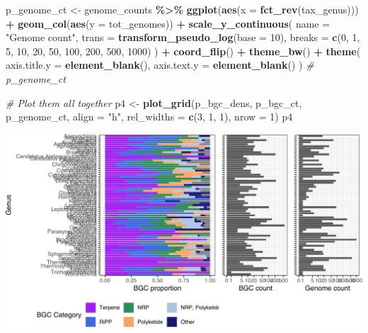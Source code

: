 \documentclass[
]{article}
\newenvironment{Shaded}{\begin{snugshade}}{\end{snugshade}}
\newcommand{\AttributeTok}[1]{\textcolor[rgb]{0.13,0.29,0.53}{#1}}
\newcommand{\CommentTok}[1]{\textcolor[rgb]{0.56,0.35,0.01}{\textit{#1}}}
\newcommand{\DecValTok}[1]{\textcolor[rgb]{0.00,0.00,0.81}{#1}}
\newcommand{\FunctionTok}[1]{\textcolor[rgb]{0.13,0.29,0.53}{\textbf{#1}}}
\newcommand{\NormalTok}[1]{#1}
\newcommand{\OtherTok}[1]{\textcolor[rgb]{0.56,0.35,0.01}{#1}}
\newcommand{\SpecialCharTok}[1]{\textcolor[rgb]{0.81,0.36,0.00}{\textbf{#1}}}
\newcommand{\StringTok}[1]{\textcolor[rgb]{0.31,0.60,0.02}{#1}}
\begin{document}
\begin{Shaded}
\begin{Highlighting}[]
\NormalTok{p\_genome\_ct }\OtherTok{\textless{}{-}}\NormalTok{ genome\_counts }\SpecialCharTok{\%\textgreater{}\%}
  \FunctionTok{ggplot}\NormalTok{(}\FunctionTok{aes}\NormalTok{(}\AttributeTok{x =} \FunctionTok{fct\_rev}\NormalTok{(tax\_genus))) }\SpecialCharTok{+}
  \FunctionTok{geom\_col}\NormalTok{(}\FunctionTok{aes}\NormalTok{(}\AttributeTok{y =}\NormalTok{ tot\_genomes)) }\SpecialCharTok{+}
  \FunctionTok{scale\_y\_continuous}\NormalTok{(}
    \AttributeTok{name =} \StringTok{"Genome count"}\NormalTok{,}
    \AttributeTok{trans =} \FunctionTok{transform\_pseudo\_log}\NormalTok{(}\AttributeTok{base =} \DecValTok{10}\NormalTok{),}
    \AttributeTok{breaks =} \FunctionTok{c}\NormalTok{(}\DecValTok{0}\NormalTok{, }\DecValTok{1}\NormalTok{, }\DecValTok{5}\NormalTok{, }\DecValTok{10}\NormalTok{, }\DecValTok{20}\NormalTok{, }\DecValTok{50}\NormalTok{, }\DecValTok{100}\NormalTok{, }\DecValTok{200}\NormalTok{, }\DecValTok{500}\NormalTok{, }\DecValTok{1000}\NormalTok{)}
\NormalTok{  ) }\SpecialCharTok{+}
  \FunctionTok{coord\_flip}\NormalTok{() }\SpecialCharTok{+}
  \FunctionTok{theme\_bw}\NormalTok{() }\SpecialCharTok{+}
  \FunctionTok{theme}\NormalTok{(}
    \AttributeTok{axis.title.y =} \FunctionTok{element\_blank}\NormalTok{(),}
    \AttributeTok{axis.text.y =} \FunctionTok{element\_blank}\NormalTok{()}
\NormalTok{  )}
\CommentTok{\# p\_genome\_ct}

\CommentTok{\# Plot them all together}
\NormalTok{p4 }\OtherTok{\textless{}{-}} \FunctionTok{plot\_grid}\NormalTok{(p\_bgc\_dens, p\_bgc\_ct, p\_genome\_ct, }\AttributeTok{align =} \StringTok{"h"}\NormalTok{, }\AttributeTok{rel\_widths =} \FunctionTok{c}\NormalTok{(}\DecValTok{3}\NormalTok{, }\DecValTok{1}\NormalTok{, }\DecValTok{1}\NormalTok{), }\AttributeTok{nrow =} \DecValTok{1}\NormalTok{)}
\NormalTok{p4}
\end{Highlighting}
\end{Shaded}

\includegraphics{analysis_files/figure-latex/unnamed-chunk-15-1.pdf}
\end{document}

